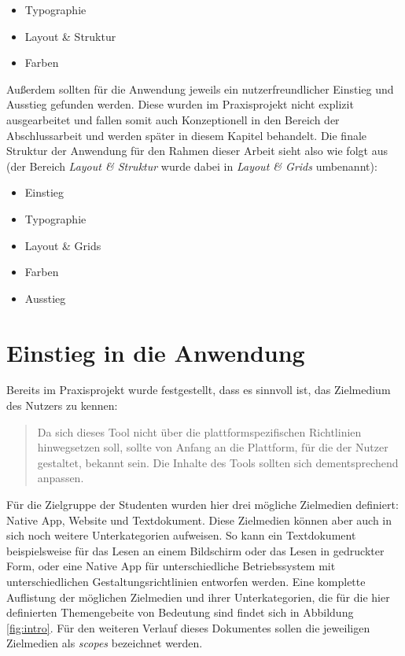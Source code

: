 \begin{itemize}
  \item Typographie
  \item Layout \& Struktur
  \item Farben
\end{itemize}

Außerdem sollten für die Anwendung jeweils ein nutzerfreundlicher Einstieg und Ausstieg gefunden werden. Diese wurden im Praxisprojekt nicht explizit ausgearbeitet und fallen somit auch Konzeptionell in den Bereich der Abschlussarbeit und werden später in diesem Kapitel behandelt.
Die finale Struktur der Anwendung für den Rahmen dieser Arbeit sieht also wie folgt aus (der Bereich \textit{Layout \& Struktur} wurde dabei in \textit{Layout \& Grids} umbenannt):

\begin{itemize}
  \item Einstieg
  \item Typographie
  \item Layout \& Grids
  \item Farben
  \item Ausstieg
\end{itemize}

\section{Einstieg in die Anwendung}
\label{chap:einstieg}
Bereits im Praxisprojekt wurde festgestellt, dass es sinnvoll ist, das Zielmedium des Nutzers zu kennen:

\begin{quote}
  Da sich dieses Tool nicht über die plattformspezifischen Richtlinien hinwegsetzen soll, sollte
von Anfang an die Plattform, für die der Nutzer gestaltet, bekannt sein. Die Inhalte des Tools
sollten sich dementsprechend anpassen. \cite{PoplawskiPP}
\end{quote}

Für die Zielgruppe der Studenten wurden hier drei mögliche Zielmedien definiert: Native App, Website und Textdokument. Diese Zielmedien können aber auch in sich noch weitere Unterkategorien aufweisen. So kann ein Textdokument beispielsweise für das Lesen an einem Bildschirm oder das Lesen in gedruckter Form, oder eine Native App für unterschiedliche Betriebssystem mit unterschiedlichen Gestaltungsrichtlinien entworfen werden. Eine komplette Auflistung der möglichen Zielmedien und ihrer Unterkategorien, die für die hier definierten Themengebeite von Bedeutung sind findet sich in Abbildung \ref{fig:intro}.
Für den weiteren Verlauf dieses Dokumentes sollen die jeweiligen Zielmedien als \textit{scopes} bezeichnet werden.

